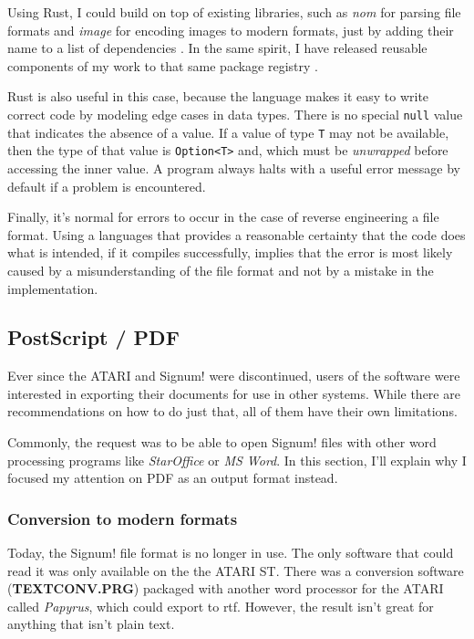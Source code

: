 Using Rust, I could build on top of existing libraries, such as \textit{nom} for parsing file formats and \textit{image} for encoding images to modern formats, just by adding their name to a list of dependencies \cites{geal2020nom, rs2020image}. In the same spirit, I have released reusable components of my work to that same package registry \cites{xipho2021signum, xipho2020pdfc, xipho2020ccitt}.

Rust is also useful in this case, because the language makes it easy to write correct code by modeling edge cases in data types. There is no special \texttt{null} value that indicates the absence of a value. If a value of type \texttt{T} may not be available, then the type of that value is \texttt{Option<T>} and, which must be \textit{unwrapped} before accessing the inner value. A program always halts with a useful error message by default if a problem is encountered.

Finally, it's normal for errors to occur in the case of reverse engineering a file format. Using a languages that provides a reasonable certainty that the code does what is intended, if it compiles successfully, implies that the error is most likely caused by a misunderstanding of the file format and not by a mistake in the implementation.

\subsection{PostScript / PDF}

Ever since the ATARI and Signum! were discontinued, users of the software
were interested in exporting their documents for use in other systems. While there are recommendations on how to do just that, all of them have their own limitations.

Commonly, the request was to be able to open Signum! files with other word processing programs like \textit{StarOffice} or \textit{MS Word}. In this section, I'll explain why I focused my attention on PDF as an output format instead.

\subsubsection{Conversion to modern formats}

Today, the Signum! file format is no longer in use. The only software that could read it was only available on the the ATARI ST. There was a conversion software (\textbf{TEXTCONV.PRG}) packaged with another word processor for the ATARI called \textit{Papyrus}, which could export to \acrfull{rtf}. However, the result isn't great for anything that isn't plain text.

